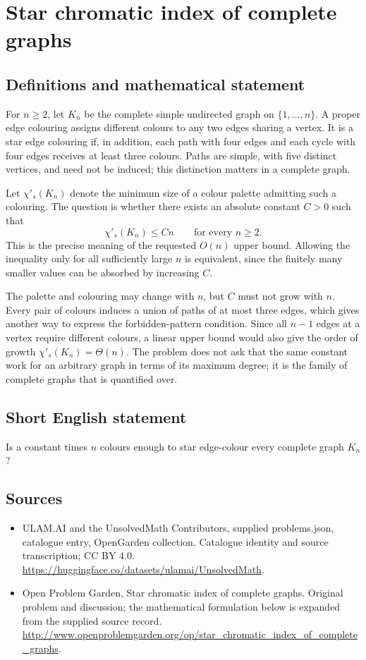 \documentclass[11pt,a4paper]{article}
\begin{document}
\section*{Star chromatic index of complete graphs}\label{statement}

\subsection{Definitions and mathematical statement}
For $n\ge2$, let $K_n$ be the complete simple undirected graph on
$\{1,\ldots,n\}$. A proper edge colouring assigns different colours to
any two edges sharing a vertex. It is a star edge colouring if, in
addition, each path with four edges and each cycle with four edges
receives at least three colours. Paths are simple, with five distinct
vertices, and need not be induced; this distinction matters in a
complete graph.

Let $\chi'_s(K_n)$ denote the minimum size of a colour palette admitting
such a colouring. The question is whether there exists an absolute
constant $C>0$ such that
\[
 \chi'_s(K_n)\le Cn\qquad\text{for every }n\ge2.
\]
This is the precise meaning of the requested $O(n)$ upper bound.
Allowing the inequality only for all sufficiently large $n$ is equivalent,
since the finitely many smaller values can be absorbed by increasing $C$.

The palette and colouring may change with $n$, but $C$ must not grow
with $n$. Every pair of colours induces a union of paths of at most
three edges, which gives another way to express the forbidden-pattern
condition. Since all $n-1$ edges at a vertex require different colours,
a linear upper bound would also give the order of growth
$\chi'_s(K_n)=\Theta(n)$.
The problem does not ask that the same constant work for an arbitrary
graph in terms of its maximum degree; it is the family of complete
graphs that is quantified over.
\subsection{Short English statement}
Is a constant times $n$ colours enough to star edge-colour every complete graph $K_n$?
\subsection{Sources}
\begin{itemize}
\item[S1] ULAM.AI and the UnsolvedMath Contributors, supplied problems.json, catalogue entry, OpenGarden collection. Catalogue identity and source transcription; CC BY 4.0.
\url{https://huggingface.co/datasets/ulamai/UnsolvedMath}.
\item[S2] Open Problem Garden, Star chromatic index of complete graphs. Original problem and discussion; the mathematical formulation below is expanded from the supplied source record.
\url{http://www.openproblemgarden.org/op/star_chromatic_index_of_complete_graphs}.
\end{itemize}
\end{document}
